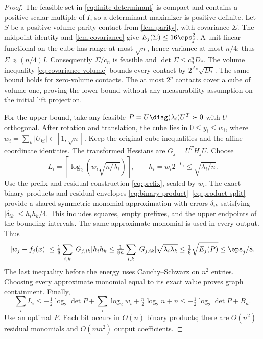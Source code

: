 \begin{proof}
The feasible set in \eqref{eq:finite-determinant} is compact and contains
a positive scalar multiple of $I$, so a determinant maximizer is positive
definite. Let $S$ be a positive-volume parity contact from
\cref{lem:parity}, with covariance $\Sigma$. The midpoint identity and
\cref{lem:covariance} give
$E_j(\Sigma)\le16\eps_j^2$. A unit linear functional on the cube has
range at most $\sqrt n$, hence variance at most $n/4$; thus
$\Sigma\preceq(n/4)I$. Consequently $\Sigma/c_n$ is feasible and
$\det\Sigma\le c_n^nD_*$. The volume inequality
\eqref{eq:covariance-volume} bounds every contact by
$2^{A_n}\sqrt{D_*}$. The same bound holds for zero-volume contacts.
The at most $2^p$ contacts cover a cube of volume one, proving the lower
bound without any measurability assumption on the initial lift projection.

For the upper bound, take any feasible
$P=U\diag(\lambda_i)U^T\succ0$ with $U$ orthogonal. After rotation and
translation, the cube lies in $0\le y_i\le w_i$, where
$w_i=\sum_k|U_{ki}|\in[1,\sqrt n]$. Keep the original cube inequalities
and the affine coordinate identities. The transformed Hessians are
$G_j=U^TH_jU$. Choose
\begin{equation}\label{eq:covariance-grid}
 L_i=\left\lceil\log_2\!\left(w_i\sqrt{n/\lambda_i}\right)\right\rceil,
 \qquad h_i=w_i2^{-L_i}\le\sqrt{\lambda_i/n}.
\end{equation}
Use the prefix and residual construction \eqref{eq:prefix}, scaled by
$w_i$. The exact binary products and residual envelopes
\eqref{eq:binary-product}--\eqref{eq:product-split} provide a shared
symmetric monomial approximation with errors $\delta_{ik}$ satisfying
$|\delta_{ik}|\le h_ih_k/4$. This includes squares, empty prefixes,
and the upper endpoints of the bounding intervals. The same approximate
monomial is used in every output. Thus
\[
 |w_j-f_j(x)|\le\tfrac18\sum_{i,k}|G_{j,ik}|h_ih_k
 \le\tfrac1{8n}\sum_{i,k}|G_{j,ik}|\sqrt{\lambda_i\lambda_k}
 \le\tfrac18\sqrt{E_j(P)}\le\eps_j/8.
\]
The last inequality before the energy uses Cauchy--Schwarz on $n^2$
entries. Choosing every approximate monomial equal to its exact value
proves graph containment. Finally,
\[
 \sum_i L_i\le-\tfrac12\log_2\det P
          +\sum_i\log_2w_i+\tfrac n2\log_2n+n
 \le-\tfrac12\log_2\det P+B_n.
\]
Use an optimal $P$. Each bit occurs in $O(n)$ binary products; there
are $O(n^2)$ residual monomials and $O(mn^2)$ output coefficients.
\end{proof}

